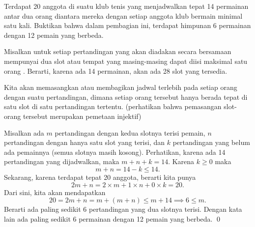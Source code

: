 \documentclass[12pt]{scrartcl}
\begin{document}
\begin{soaljawab}
Terdapat 20 anggota di suatu klub tenis yang menjadwalkan tepat 14 permainan antar dua orang diantara mereka dengan setiap anggota klub bermain minimal satu kali. Buktikan bahwa dalam pembagian ini, terdapat himpunan 6 permainan dengan 12 pemain yang berbeda.\\
	
\begin{solusi}
    Misalkan untuk setiap pertandingan yang akan diadakan secara bersamaan mempunyai dua slot atau tempat yang masing-masing dapat diisi maksimal satu orang . Berarti, karena ada 14 permainan, akan ada 28 slot yang tersedia.
    
    Kita akan memasangkan atau membagikan jadwal terlebih pada setiap orang dengan suatu pertandingan, dimana setiap orang tersebut hanya berada tepat di satu slot di satu pertandingan tertentu. (perhatikan bahwa pemasangan slot-orang tersebut merupakan pemetaan injektif)
    
    
     Misalkan ada $m$ pertandingan dengan kedua slotnya terisi pemain, $n$ pertandingan dengan hanya satu slot yang terisi, dan $k$ pertandingan yang belum ada pemainnya (semua slotnya masih kosong). Perhatikan, karena ada 14 pertandingan yang dijadwalkan, maka $m+n+k=14$. Karena $k \ge 0$ maka $$m+n=14-k \le 14.$$
     Sekarang, karena terdapat tepat 20 anggota, berarti kita punya $$2m+n=2\times m+1 \times n+0 \times k =20.$$ Dari sini, kita akan mendapatkan $$20=2m+n=m+(m+n) \le m + 14 \implies 6 \le m.$$ Berarti ada paling sedikit 6 pertandingan yang dua slotnya terisi. Dengan kata lain ada paling sedikit 6 permainan dengan 12 pemain yang berbeda. \qed
\end{solusi}
\end{soaljawab}
\end{document}
